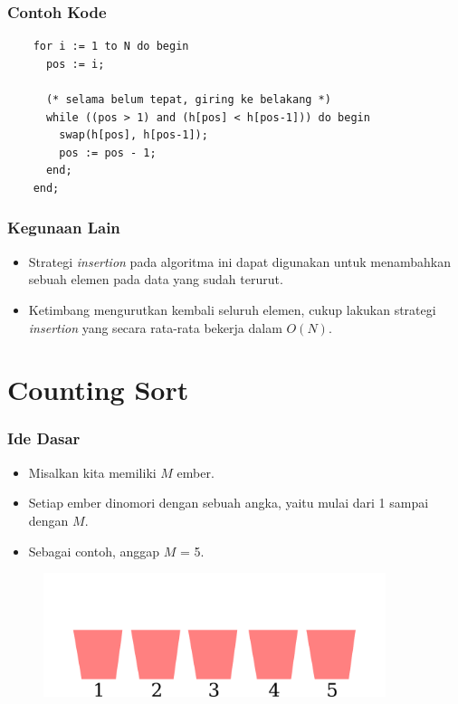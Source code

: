 \begin{frame}[fragile]
\frametitle{Contoh Kode}
  \begin{lstlisting}
    for i := 1 to N do begin
      pos := i;
      
      (* selama belum tepat, giring ke belakang *)
      while ((pos > 1) and (h[pos] < h[pos-1])) do begin
        swap(h[pos], h[pos-1]);
        pos := pos - 1;
      end;
    end;
  \end{lstlisting}
\end{frame}

\begin{frame}
\frametitle{Kegunaan Lain}
  \begin{itemize}
    \item Strategi \textit{insertion} pada algoritma ini dapat digunakan untuk menambahkan sebuah elemen pada data yang sudah terurut.
    \item Ketimbang mengurutkan kembali seluruh elemen, cukup
    lakukan strategi \textit{insertion} yang secara rata-rata bekerja dalam
    $O(N)$.
  \end{itemize}
\end{frame}

\section{Counting Sort}
\frame{\sectionpage}

\begin{frame}
\frametitle{Ide Dasar}
  \begin{itemize}
    \item Misalkan kita memiliki $M$ ember.
    \item Setiap ember dinomori dengan sebuah angka, yaitu mulai dari 1 sampai dengan $M$.
    \item Sebagai contoh, anggap $M$ = 5.
  \end{itemize}  
  \begin{figure}
    \includegraphics[width=10cm]{asset/counting-sort-1.pdf}
  \end{figure}
\end{frame}


